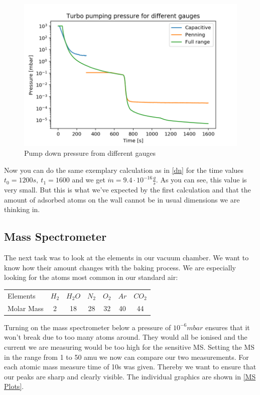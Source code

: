 \documentclass[]{article}
\begin{document}
\begin{figure}[!h]
	\centering
	\includegraphics[width=0.7\linewidth]{Plots/PumpingPressure}
	\caption{Pump down pressure from different gauges}
	\label{fig:pumpingpressure}
\end{figure}

Now you can do the same exemplary calculation as in \ref{dn} for the time values $t_0=1200s, \: t_1=1600$ and we get $ \dot{m} = 9.4\cdot10^{-16} \frac{g}{s}$. 
As you can see, this value is very small. But this is what we've expected by the first calculation and that the amount of adsorbed atoms on the wall cannot be in usual dimensions we are thinking in.


\subsection{Mass Spectrometer}
The next task was to look at the elements in our vacuum chamber. We want to know how their amount changes with the baking process. We are especially looking for the atoms most common in our standard air:

\begin{table}[h]
\centering
\begin{tabular}{lcccccc}
Elements & $H_2$ & $H_2O$ & $N_2$ & $O_2$ & $Ar$ & $CO_2$ \\
Molar Mass & 2 & 18 & 28 & 32 & 40 & 44 \\
\end{tabular} 
\end{table}

Turning on the mass spectrometer below a pressure of $10^{-6} mbar$ ensures that it won't break due to too many atoms around. They would all be ionised and the current we are measuring would be too high for the sensitive MS. Setting the MS in the range from 1 to 50 amu we now can compare our two measurements. For each atomic mass measure time of 10s was given. Thereby we want to ensure that our peaks are sharp and clearly visible. The individual graphics are shown in \ref{MS Plots}.
\end{document}
